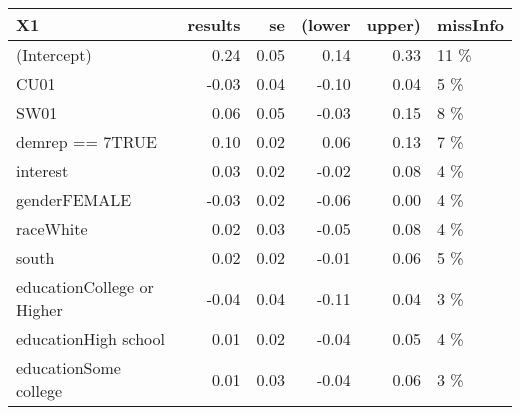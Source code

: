 \begin{table}[H]
\centering
\begin{tabular}{lrrrrl}
\toprule
X1 & results & se & (lower & upper) & missInfo\\
\midrule
(Intercept) & 0.24 & 0.05 & 0.14 & 0.33 & 11 \%\\
CU01 & -0.03 & 0.04 & -0.10 & 0.04 & 5 \%\\
SW01 & 0.06 & 0.05 & -0.03 & 0.15 & 8 \%\\
demrep == 7TRUE & 0.10 & 0.02 & 0.06 & 0.13 & 7 \%\\
interest & 0.03 & 0.02 & -0.02 & 0.08 & 4 \%\\
\addlinespace
genderFEMALE & -0.03 & 0.02 & -0.06 & 0.00 & 4 \%\\
raceWhite & 0.02 & 0.03 & -0.05 & 0.08 & 4 \%\\
south & 0.02 & 0.02 & -0.01 & 0.06 & 5 \%\\
educationCollege or Higher & -0.04 & 0.04 & -0.11 & 0.04 & 3 \%\\
educationHigh school & 0.01 & 0.02 & -0.04 & 0.05 & 4 \%\\
\addlinespace
educationSome college & 0.01 & 0.03 & -0.04 & 0.06 & 3 \%\\
\bottomrule
\end{tabular}
\end{table}